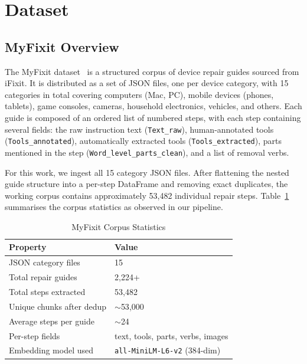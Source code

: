 \documentclass[journal,onecolumn]{IEEEtran}
\begin{document}
\section{Dataset}
\label{sec:dataset}

\subsection{MyFixit Overview}

The MyFixit dataset~\cite{myfixit2021} is a structured corpus of device repair
guides sourced from iFixit. It is distributed as a set of JSON files, one per
device category, with 15 categories in total covering computers (Mac, PC),
mobile devices (phones, tablets), game consoles, cameras, household
electronics, vehicles, and others. Each guide is composed of an ordered list
of numbered steps, with each step containing several fields: the raw
instruction text (\texttt{Text\_raw}), human-annotated tools
(\texttt{Tools\_annotated}), automatically extracted tools
(\texttt{Tools\_extracted}), parts mentioned in the step
(\texttt{Word\_level\_parts\_clean}), and a list of removal verbs.

For this work, we ingest all 15 category JSON files. After flattening the
nested guide structure into a per-step DataFrame and removing exact
duplicates, the working corpus contains approximately 53,482 individual repair
steps. Table~\ref{tab:dataset} summarises the corpus statistics as observed
in our pipeline.

\begin{table}[h]
\centering
\caption{MyFixit Corpus Statistics}
\label{tab:dataset}
\begin{tabular}{ll}
\toprule
\textbf{Property} & \textbf{Value} \\
\midrule
JSON category files            & 15 \\
Total repair guides            & 2{,}224+ \\
Total steps extracted          & 53{,}482 \\
Unique chunks after dedup      & $\sim$53{,}000 \\
Average steps per guide        & $\sim$24 \\
Per-step fields                & text, tools, parts, verbs, images \\
Embedding model used           & \texttt{all-MiniLM-L6-v2} (384-dim) \\
\bottomrule
\end{tabular}
\end{table}
\end{document}
